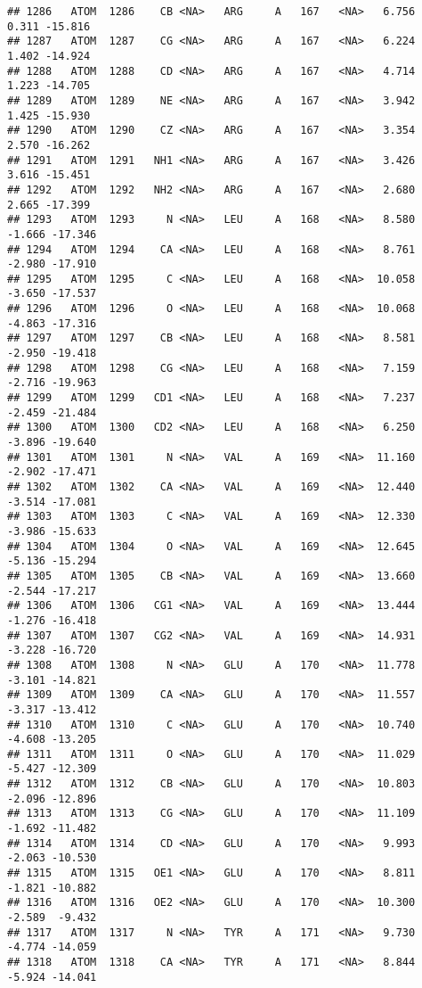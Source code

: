\documentclass[
]{article}
\begin{document}
\begin{verbatim}
## 1286   ATOM  1286    CB <NA>   ARG     A   167   <NA>   6.756   0.311 -15.816
## 1287   ATOM  1287    CG <NA>   ARG     A   167   <NA>   6.224   1.402 -14.924
## 1288   ATOM  1288    CD <NA>   ARG     A   167   <NA>   4.714   1.223 -14.705
## 1289   ATOM  1289    NE <NA>   ARG     A   167   <NA>   3.942   1.425 -15.930
## 1290   ATOM  1290    CZ <NA>   ARG     A   167   <NA>   3.354   2.570 -16.262
## 1291   ATOM  1291   NH1 <NA>   ARG     A   167   <NA>   3.426   3.616 -15.451
## 1292   ATOM  1292   NH2 <NA>   ARG     A   167   <NA>   2.680   2.665 -17.399
## 1293   ATOM  1293     N <NA>   LEU     A   168   <NA>   8.580  -1.666 -17.346
## 1294   ATOM  1294    CA <NA>   LEU     A   168   <NA>   8.761  -2.980 -17.910
## 1295   ATOM  1295     C <NA>   LEU     A   168   <NA>  10.058  -3.650 -17.537
## 1296   ATOM  1296     O <NA>   LEU     A   168   <NA>  10.068  -4.863 -17.316
## 1297   ATOM  1297    CB <NA>   LEU     A   168   <NA>   8.581  -2.950 -19.418
## 1298   ATOM  1298    CG <NA>   LEU     A   168   <NA>   7.159  -2.716 -19.963
## 1299   ATOM  1299   CD1 <NA>   LEU     A   168   <NA>   7.237  -2.459 -21.484
## 1300   ATOM  1300   CD2 <NA>   LEU     A   168   <NA>   6.250  -3.896 -19.640
## 1301   ATOM  1301     N <NA>   VAL     A   169   <NA>  11.160  -2.902 -17.471
## 1302   ATOM  1302    CA <NA>   VAL     A   169   <NA>  12.440  -3.514 -17.081
## 1303   ATOM  1303     C <NA>   VAL     A   169   <NA>  12.330  -3.986 -15.633
## 1304   ATOM  1304     O <NA>   VAL     A   169   <NA>  12.645  -5.136 -15.294
## 1305   ATOM  1305    CB <NA>   VAL     A   169   <NA>  13.660  -2.544 -17.217
## 1306   ATOM  1306   CG1 <NA>   VAL     A   169   <NA>  13.444  -1.276 -16.418
## 1307   ATOM  1307   CG2 <NA>   VAL     A   169   <NA>  14.931  -3.228 -16.720
## 1308   ATOM  1308     N <NA>   GLU     A   170   <NA>  11.778  -3.101 -14.821
## 1309   ATOM  1309    CA <NA>   GLU     A   170   <NA>  11.557  -3.317 -13.412
## 1310   ATOM  1310     C <NA>   GLU     A   170   <NA>  10.740  -4.608 -13.205
## 1311   ATOM  1311     O <NA>   GLU     A   170   <NA>  11.029  -5.427 -12.309
## 1312   ATOM  1312    CB <NA>   GLU     A   170   <NA>  10.803  -2.096 -12.896
## 1313   ATOM  1313    CG <NA>   GLU     A   170   <NA>  11.109  -1.692 -11.482
## 1314   ATOM  1314    CD <NA>   GLU     A   170   <NA>   9.993  -2.063 -10.530
## 1315   ATOM  1315   OE1 <NA>   GLU     A   170   <NA>   8.811  -1.821 -10.882
## 1316   ATOM  1316   OE2 <NA>   GLU     A   170   <NA>  10.300  -2.589  -9.432
## 1317   ATOM  1317     N <NA>   TYR     A   171   <NA>   9.730  -4.774 -14.059
## 1318   ATOM  1318    CA <NA>   TYR     A   171   <NA>   8.844  -5.924 -14.041

\end{verbatim}
\end{document}

